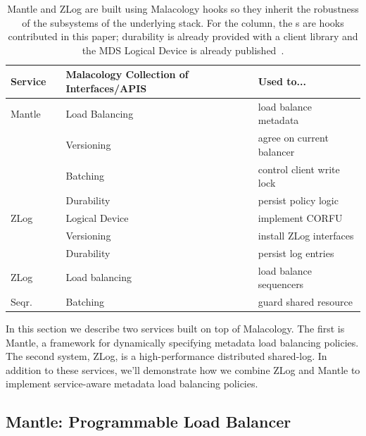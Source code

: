 \documentclass[10pt,twocolumn]{article}
\newcommand{\cmark}{\ding{51}}%
\begin{document}
\label{services}
\begin{table}
\centering
\begin{tabular}{  l | l | l | l }
\textbf{Service} & \text{*} & \textbf{Malacology Collection of Interfaces/APIS}       & \textbf{Used to...}  \\ \hline
Mantle           &          & Load Balancing      & load balance metadata \\
                 & \cmark   & Versioning          & agree on current balancer \\ 
                 & \cmark   & Batching            & control client write lock \\
                 &          & Durability          & persist policy logic \\\hline
ZLog             & \cmark   & Logical Device      & implement CORFU \\ 
                 & \cmark   & Versioning          & install ZLog interfaces \\
                 &          & Durability          & persist log entries \\ \hline
ZLog             &          & Load balancing      & load balance sequencers \\
Seqr.            & \cmark   & Batching            & guard shared resource \\ %
\end{tabular}
\caption{Mantle and ZLog are built using Malacology hooks so they inherit the
robustness of the subsystems of the underlying stack. For the \text{*} column,
the \cmark s are hooks contributed in this paper; durability is already
provided with a client library and the MDS Logical Device is already
published~\cite{sevilla:sc15-mantle}. }
\label{table:implementation}
\end{table}

In this section we describe two services built on top of Malacology. The first
is Mantle, a framework for dynamically specifying metadata load balancing
policies. The second system, ZLog, is a high-performance distributed shared-log.
In addition to these services, we'll demonstrate how we combine ZLog and Mantle
to implement service-aware metadata load balancing policies.

\subsection{Mantle: Programmable Load Balancer}
\label{sec:mantle}
\end{document}
